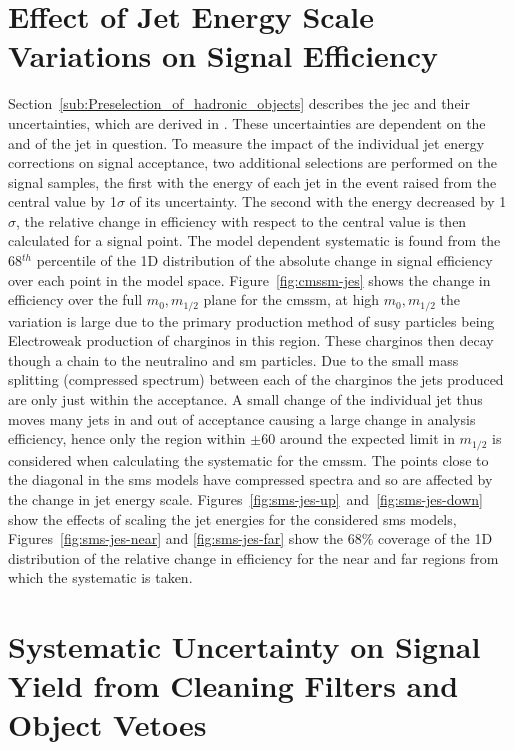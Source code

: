 \section{Effect of Jet Energy Scale Variations on Signal Efficiency} 
\label{sub:effects_of_jet_energy_scale_on_signal_efficiency}
Section~\ref{sub:Preselection_of_hadronic_objects} describes the \ac{jec} and 
their uncertainties, which are derived in . These 
uncertainties are dependent  on the \mETA and \ET of the jet in question. To 
measure the impact of the individual jet energy corrections on signal 
acceptance, two additional selections are performed on the signal samples, the 
first with the energy of each jet in the event raised from the central value by 
1$\sigma$ of its uncertainty. The second with the energy decreased by 
1$\sigma$, the relative change in efficiency with respect to the central value 
is then calculated for a signal point. The model dependent  systematic is found 
from the 68$^{th}$ percentile of the 1D distribution of the absolute change in 
signal efficiency over each point in the model space. 
Figure~\ref{fig:cmssm-jes} shows the change in efficiency over the full $m_{0}, 
m_{1/2}$ plane for the \ac{cmssm}, at high $m_{0}, m_{1/2}$ the variation is 
large due to the primary production method of 
\ac{susy} particles being Electroweak production of charginos in this region. 
These charginos then decay though a chain to the neutralino and \ac{sm} 
particles. Due to the small mass splitting (compressed spectrum) between each of the charginos the jets produced are only just within the \ET acceptance. A small change of the individual jet \ET thus moves many jets in and out of 
acceptance causing a large change in analysis efficiency, hence only the region 
within $\pm$\unit{60}{\GeV} around the expected limit in $m_{1/2}$ is 
considered when calculating the systematic for the \ac{cmssm}. The points close 
to the diagonal in the \ac{sms} models have compressed spectra and so are 
affected by the change in jet energy scale. 
Figures~\ref{fig:sms-jes-up}~and~\ref{fig:sms-jes-down} show the effects of 
scaling the jet energies for the considered \ac{sms} models, 
Figures~\ref{fig:sms-jes-near} and \ref{fig:sms-jes-far} show the 68$\%$ 
coverage of the 1D distribution of the relative change in efficiency for the 
near and far regions from which the systematic is taken.

\section{Systematic Uncertainty on Signal Yield from Cleaning Filters and Object Vetoes} %
\label{sub:systematic_uncertainty_on_signal_yield_from_cleaning_filters_and_object_vetoes_}

